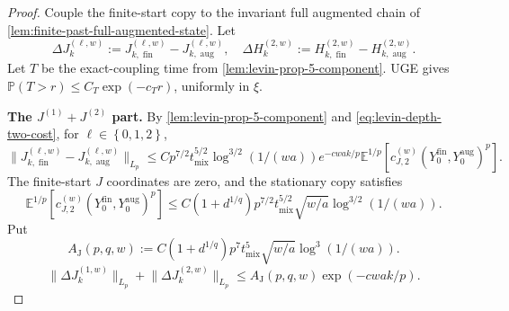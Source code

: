 \begin{proof} Couple the finite-start copy to the invariant full augmented chain of
\cref{lem:finite-past-full-augmented-state}. Let
\[
\Delta J_{k}^{(\ell,w)}
  := J_{k, \operatorname{fin}}^{(\ell,w)} - J_{k, \operatorname{aug}}^{(\ell,w)},
\quad
\Delta H_{k}^{(2,w)}
  := H_{k, \operatorname{fin}}^{(2,w)} - H_{k, \operatorname{aug}}^{(2,w)}.
\]
Let $T$ be the exact-coupling time from \cref{lem:levin-prop-5-component}. UGE gives
$\mathbb{P}(T > r) \le C_{T} \exp\left(-c_{T} r\right)$, uniformly in $\xi$.

\textbf{The $J^{(1)} + J^{(2)}$ part.} By \cref{lem:levin-prop-5-component} and
\eqref{eq:levin-depth-two-cost}, for $\ell \in \left\{ 0,1,2 \right\}$,
\begin{equation}
\lVert J_{k, \operatorname{fin}}^{(\ell,w)} - J_{k, \operatorname{aug}}^{(\ell,w)} \rVert_{L_{p}}
  \le C p^{7 / 2} t_{\mathrm{mix}}^{5 / 2}
     \log^{3 / 2}(1 / (w a))
     e^{-c w a k / p}
     \mathbb{E}^{1 / p} [c_{J,2}^{(w)}(Y_{0}^{\mathrm{fin}},Y_{0}^{\mathrm{aug}})^{p}].
\label{eq:burn-J-startup-proof}
\end{equation}
The finite-start $J$ coordinates are zero, and the stationary copy satisfies
\begin{equation}
\mathbb{E}^{1 / p} [c_{J,2}^{(w)}(Y_{0}^{\mathrm{fin}},Y_{0}^{\mathrm{aug}})^{p}]
  \le C (1 + d^{1 / q}) p^{7 / 2} t_{\mathrm{mix}}^{5 / 2}
     \sqrt{w / a} \log^{3 / 2}(1 / (w a)).
\label{eq:burn-initial-cost-proof}
\end{equation}
Put
\begin{equation}
A_{\mathrm{J}}(p,q,w)
  := C (1 + d^{1 / q}) p^{7} t_{\mathrm{mix}}^{5} \sqrt{w / a}
     \log^{3}(1 / (w a)).
\label{eq:burn-startup-J-scale}
\end{equation}
\begin{equation}
\lVert \Delta J_{k}^{(1,w)} \rVert_{L_{p}} + \lVert \Delta J_{k}^{(2,w)} \rVert_{L_{p}}
  \le A_{\mathrm{J}}(p,q,w) \exp\left(-c w a k / p\right).
\label{eq:burn-J12-startup-bound}
\end{equation}


\end{proof}
